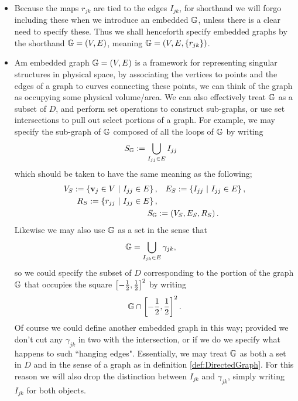 \begin{itemize}
	\item Because the maps $r_{jk}$ are tied to the edges $I_{jk}$, for shorthand we will forgo including these when we introduce an embedded $\mathbb{G}$, unless there is a clear need to specify these.
	Thus we shall henceforth specify embedded graphs by the shorthand $\mathbb{G}=\left( V,E \right)$, meaning $\mathbb{G}=\left( V, E, \left\{ r_{jk} \right\} \right)$.
	\item Am embedded graph $\mathbb{G} = \left( V,E \right)$ is a framework for representing singular structures in physical space, by associating the vertices to points and the edges of a graph to curves connecting these points, we can think of the graph as occupying some physical volume/area.
	We can also effectively treat $\mathbb{G}$ as a subset of $D$, and perform set operations to construct sub-graphs, or use set intersections to pull out select portions of a graph.
	For example, we may specify the sub-graph of $\mathbb{G}$ composed of all the loops of $\mathbb{G}$ by writing
	\begin{align*}
		S_{\mathbb{G}} &:= \bigcup_{I_{jj}\in E} I_{jj}
	\end{align*}
	which should be taken to have the same meaning as the following;
	\begin{align*}
		V_S := \left\{ \mathbf{v}_j\in V \ \vert \ I_{jj}\in E \right\}, &\quad E_S := \left\{ I_{jj} \ \vert \ I_{jj}\in E \right\}, \\
		R_S := \left\{ r_{jj} \ \vert \ I_{jj}\in E \right\}, &\\
		S_{\mathbb{G}} &:= \left( V_S, E_S, R_S \right).
	\end{align*}
	Likewise we may also use $\mathbb{G}$ as a set in the sense that
	\begin{align*}
		\mathbb{G} &= \bigcup_{I_{jk}\in E} \gamma_{jk},
	\end{align*}
	so we could specify the subset of $D$ corresponding to the portion of the graph $\mathbb{G}$ that occupies the square $\left[ -\frac{1}{2},\frac{1}{2} \right]^2$ by writing
	\begin{align*}
		\mathbb{G} \cap \left[ -\frac{1}{2},\frac{1}{2} \right]^2.
	\end{align*}
	Of course we could define another embedded graph in this way; provided we don't cut any $\gamma_{jk}$ in two with the intersection, or if we do we specify what happens to such ``hanging edges".
	Essentially, we may treat $\mathbb{G}$ as both a set in $D$ and in the sense of a graph as in definition \ref{def:DirectedGraph}.
	For this reason we will also drop the distinction between $I_{jk}$ and $\gamma_{jk}$, simply writing $I_{jk}$ for both objects.

\end{itemize}
